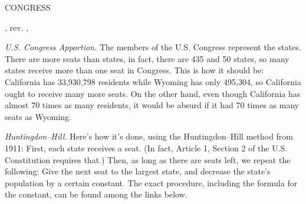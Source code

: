 \documentclass[9pt]{memoir}
\begin{document}

 {\fontsize{80}{110}\selectfont\textsc{CONGRESS}}

\bigskip
  {\GITAuthorName,
    rev. \GITAbrHash, \GITAuthorDate}

\begin{multicols}{2}
\textit{U.S. Congress Apportion. }
  The members of the U.S.
  Congress represent the states.
  There are more seats than states, in fact, there are 435 and 50
  states, so many states receive more than one seat in Congress.
  This is how it should be: California has 33,930,798 residents while
  Wyoming has only 495,304, so California ought to receive many more
  seats.
  On the other hand, even though California has almost 70 times as
  many residents, it would be absurd if it had 70 times as many seats
  as Wyoming.

\bigskip
\textit{Huntingdon--Hill.}
Here’s how it’s done, using the Huntingdon–Hill method from 1911:
First, each state receives a seat. (In fact, Article 1, Section 2 of
the U.S. Constitution requires that.) Then, as long as there are seats
left, we repeat the following: Give the next seat to the largest
state, and decrease the state’s population by a certain constant. The
exact procedure, including the formula for the constant, can be found
among the links below.

\bigskip
\noindent
{}

\bigskip
\noindent
{}
\end{multicols}
\end{document}
